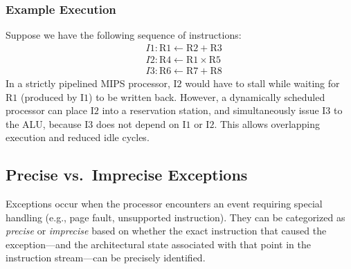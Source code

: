 \subsubsection*{Example Execution}
Suppose we have the following sequence of instructions:
\[
\begin{aligned}
&I1: \text{R1} \leftarrow \text{R2} + \text{R3}\\
&I2: \text{R4} \leftarrow \text{R1} \times \text{R5}\\
&I3: \text{R6} \leftarrow \text{R7} + \text{R8}
\end{aligned}
\]
In a strictly pipelined MIPS processor, \(\text{I2}\) would have to stall
while waiting for \(\text{R1}\) (produced by \(\text{I1}\)) to be written back.
However, a dynamically scheduled processor can place \(\text{I2}\) into a
reservation station, and simultaneously issue \(\text{I3}\) to the ALU,
because \(\text{I3}\) does not depend on \(\text{I1}\) or \(\text{I2}\).
This allows overlapping execution and reduced idle cycles.
\newpage
\subsection{Precise vs.\ Imprecise Exceptions}
Exceptions occur when the processor encounters an event requiring special handling (e.g., page fault, unsupported instruction).
They can be categorized as \emph{precise} or \emph{imprecise} based on whether the exact instruction that caused the exception---and the architectural state associated with that point in the instruction stream---can be precisely identified.

